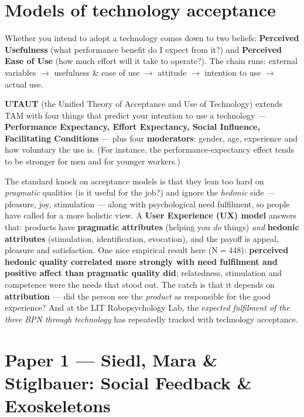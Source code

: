 \documentclass[11pt, oneside]{book}
\begin{document}
\section{Models of technology acceptance}

\begin{defbox}[title={TAM — Technology Acceptance Model}]
Whether you intend to adopt a technology comes down to two beliefs:
\textbf{Perceived Usefulness} (what performance benefit do I expect from it?)
and \textbf{Perceived Ease of Use} (how much effort will it take to operate?).
The chain runs: external variables $\to$ usefulness \& ease of use $\to$
attitude $\to$ intention to use $\to$ actual use.
\end{defbox}

\textbf{UTAUT} (the Unified Theory of Acceptance and Use of Technology) extends
TAM with four things that predict your intention to use a technology —
\textbf{Performance Expectancy, Effort Expectancy, Social Influence,
Facilitating Conditions} — plus four \textbf{moderators}: gender, age,
experience and how voluntary the use is. (For instance, the
performance-expectancy effect tends to be stronger for men and for younger
workers.)

The standard knock on acceptance models is that they lean too hard on
\emph{pragmatic} qualities (is it useful for the job?) and ignore the
\emph{hedonic} side — pleasure, joy, stimulation — along with psychological
need fulfilment, so people have called for a more holistic view. A \textbf{User
Experience (UX) model} answers that: products have \textbf{pragmatic
attributes} (helping you \emph{do} things) \emph{and} \textbf{hedonic
attributes} (stimulation, identification, evocation), and the payoff is appeal,
pleasure and satisfaction. One nice empirical result here (N$=$448):
\textbf{perceived hedonic quality correlated more strongly with need fulfilment
and positive affect than pragmatic quality did}; relatedness, stimulation and
competence were the needs that stood out. The catch is that it depends on
\textbf{attribution} — did the person see the \emph{product} as responsible for
the good experience? And at the LIT Robopsychology Lab, the \emph{expected
fulfilment of the three BPN through technology} has repeatedly tracked with
technology acceptance.

\section{Paper 1 — Siedl, Mara \& Stiglbauer: Social Feedback \& Exoskeletons}
\end{document}
